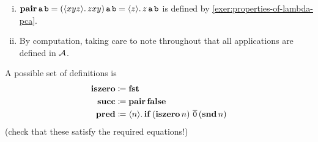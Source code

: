 
\vspace{-0.5\baselineskip}

\begin{enumerate}[(i)]
  \item
    \( \pcapair \pca a \pca b =
      (\lambdapca{xyz}{zxy}) \pca a \pca b =
      \lambdapca{z}{z \pca a \pca b}\)
    is defined by \cref{exer:properties-of-lambda-pca}.

  \item
    By computation, taking care to note throughout that all applications are
    defined in \(\AA\).
\end{enumerate}



A possible set of definitions is
\begin{align*}
    \pcaiszero & \defeq \pcafst \\
    \pcasucc & \defeq \pcapair \pcafalse \\
    \pcapred & \defeq \lambdapca{n}{\pcaif\,(\pcaiszero n)\,\numeral{0}\,(\pcasnd n)}
\end{align*}
(check that these satisfy the required equations!)


